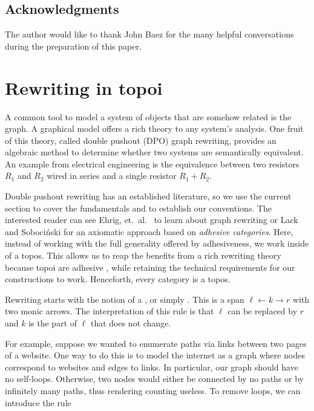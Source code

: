 \documentclass[oneside]{amsart}
\begin{document}
\subsection{Acknowledgments}
\label{sec:acknowledgements}

The author would like to thank John Baez for the many
helpful conversations during the preparation of this paper.


\section{Rewriting in topoi}
\label{sec:RewriteTopoi}

A common tool to model a system of objects that
are somehow related is the graph. A
graphical model offers a rich theory to any
system's analysis. One fruit of this theory,
called double pushout (DPO) graph rewriting,
provides an algebraic method to determine whether
two systems are semantically equivalent. An
example from electrical engineering is the
equivalence between two resistors $ R_1 $ and $ R_2 $ wired in series
and a single resistor $ R_1 + R_2 $.

Double pushout rewriting has an established
literature, so we use the current section to cover
the fundamentals and to establish our conventions.
The interested reader can see Ehrig, et.\ al.\
\parencite{Ehrig_GraphGram} to learn about graph
rewriting or Lack and Soboci\'{n}ski
\parencite{LackSobo_Adhesive} for an axiomatic approach
based on \emph{adhesive categories}. Here, instead
of working with the full generality offered by
adhesiveness, we work inside of a
topos. This allows us to reap the benefits from a
rich rewriting theory because topoi are
adhesive \parencite{LackSobo_TopsIsAdh}, while
retaining the technical requirements for our
constructions to work. Henceforth, every category
is a topos.

Rewriting starts with the notion of a , or
simply . This is a span $\ell \gets k \to r$
with two monic arrows. The interpretation of this rule is that
$ \ell $ can be replaced by $ r $ and $ k $ is the part of
$ \ell $ that does not change.

For example, suppose we wanted to enumerate paths
via links between two pages of a website. One way
to do this is to model the internet as a graph
where nodes correspond to websites and edges to
links.  In particular, our graph should have no
self-loops. Otherwise, two nodes would either be
connected by no paths or by infinitely many paths,
thus rendering counting useless.  To remove loops,
we can introduce the rule

\end{document}

